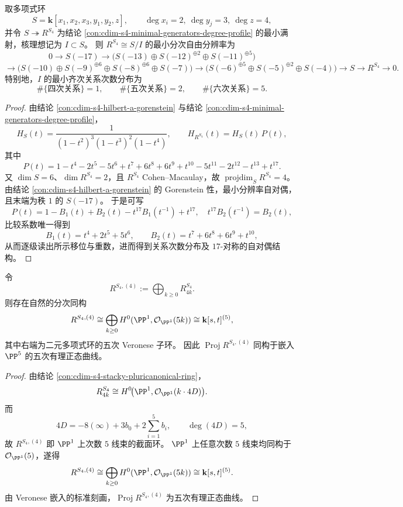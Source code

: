 \begin{conclusion}[加权射影模型的最小分辨率与关系次数分布]\label{con:cdim-s4-minimal-resolution-shifts}
取多项式环
\[
S=\mathbf k[x_1,x_2,x_3,y_1,y_2,z],\qquad
\deg x_i=2,\ \deg y_j=3,\ \deg z=4,
\]
并令 \(S\twoheadrightarrow R^{S_4}\) 为结论 \ref{con:cdim-s4-minimal-generators-degree-profile} 的最小满射，核理想记为 \(I\subset S\)。
则 \(R^{S_4}\cong S/I\) 的最小分次自由分辨率为
\[
0\to S(-17)\to
\bigl(S(-13)\oplus S(-12)^{\oplus2}\oplus S(-11)^{\oplus5}\bigr)
\]
\[
\to
\bigl(S(-10)\oplus S(-9)^{\oplus6}\oplus S(-8)^{\oplus6}\oplus S(-7)\bigr)
\to
\bigl(S(-6)^{\oplus5}\oplus S(-5)^{\oplus2}\oplus S(-4)\bigr)
\to S\to R^{S_4}\to0.
\]
特别地，\(I\) 的最小齐次关系次数分布为
\[
\#\{\text{四次关系}\}=1,\qquad
\#\{\text{五次关系}\}=2,\qquad
\#\{\text{六次关系}\}=5.
\]
\end{conclusion}
\begin{proof}
由结论 \ref{con:cdim-s4-hilbert-a-gorenstein} 与结论 \ref{con:cdim-s4-minimal-generators-degree-profile}，
\[
H_S(t)=\frac{1}{(1-t^2)^3(1-t^3)^2(1-t^4)},\qquad
H_{R^{S_4}}(t)=H_S(t)\,P(t),
\]
其中
\[
P(t)=1-t^4-2t^5-5t^6+t^7+6t^8+6t^9+t^{10}-5t^{11}-2t^{12}-t^{13}+t^{17}.
\]
又 \(\dim S=6\)、\(\dim R^{S_4}=2\)，且 \(R^{S_4}\) Cohen--Macaulay，故 \(\operatorname{projdim}_S R^{S_4}=4\)。
由结论 \ref{con:cdim-s4-hilbert-a-gorenstein} 的 Gorenstein 性，最小分辨率自对偶，且末端为秩 \(1\) 的 \(S(-17)\)。
于是可写
\[
P(t)=1-B_1(t)+B_2(t)-t^{17}B_1(t^{-1})+t^{17},
\quad t^{17}B_2(t^{-1})=B_2(t),
\]
比较系数唯一得到
\[
B_1(t)=t^4+2t^5+5t^6,\qquad
B_2(t)=t^7+6t^8+6t^9+t^{10},
\]
从而逐级读出所示移位与重数，进而得到关系次数分布及 \(17\)-对称的自对偶结构。
\end{proof}

\begin{conclusion}\label{con:cdim-s4-veronese-five-rational-normal-curve}
令
\[
R^{S_4,(4)}:=\bigoplus_{k\ge0}R^{S_4}_{4k}.
\]
则存在自然的分次同构
\[
R^{S_4,(4)}
\cong
\bigoplus_{k\ge0}H^0(\PP^1,\mathcal O_{\PP^1}(5k))
\cong
\mathbf k[s,t]^{(5)},
\]
其中右端为二元多项式环的五次 Veronese 子环。
因此 \(\operatorname{Proj}R^{S_4,(4)}\) 同构于嵌入 \(\PP^5\) 的五次有理正态曲线。
\end{conclusion}
\begin{proof}
由结论 \ref{con:cdim-s4-stacky-pluricanonical-ring}，
\[
R^{S_4}_{4k}\cong H^0\!\bigl(\PP^1,\mathcal O_{\PP^1}(k\cdot 4D)\bigr).
\]
而
\[
4D=-8(\infty)+3b_0+2\sum_{i=1}^5 b_i,\qquad \deg(4D)=5,
\]
故 \(R^{S_4,(4)}\) 即 \(\PP^1\) 上次数 \(5\) 线束的截面环。
\(\PP^1\) 上任意次数 \(5\) 线束均同构于 \(\mathcal O_{\PP^1}(5)\)，遂得
\[
R^{S_4,(4)}\cong \bigoplus_{k\ge0}H^0(\PP^1,\mathcal O_{\PP^1}(5k))
\cong \mathbf k[s,t]^{(5)}.
\]
由 Veronese 嵌入的标准刻画，\(\operatorname{Proj}R^{S_4,(4)}\) 为五次有理正态曲线。
\end{proof}

